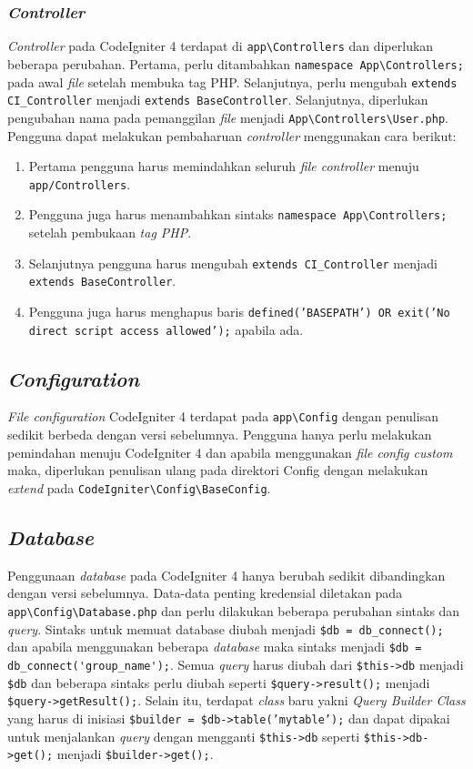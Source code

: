 \subsubsection{\textit{Controller}}
\textit{Controller} pada CodeIgniter 4 terdapat di \verb|app\Controllers| dan diperlukan beberapa perubahan. Pertama, perlu ditambahkan \verb|namespace App\Controllers;| pada awal \textit{file} setelah membuka tag PHP. Selanjutnya, perlu mengubah \verb|extends CI_Controller| menjadi \verb|extends BaseController|. Selanjutnya, diperlukan pengubahan nama pada pemanggilan \textit{file} menjadi \verb|App\Controllers\User.php|. Pengguna dapat melakukan pembaharuan \textit{controller} menggunakan cara berikut:
\begin{enumerate}
\item Pertama pengguna harus memindahkan seluruh \textit{file controller} menuju \verb|app/Controllers|.
\item Pengguna juga harus menambahkan sintaks \verb|namespace App\Controllers;| setelah pembukaan \textit{tag PHP}.
\item Selanjutnya pengguna harus mengubah \verb|extends CI_Controller| menjadi \verb|extends BaseController|.
\item Pengguna juga harus menghapus baris \texttt{defined('BASEPATH') OR exit('No direct script access allowed');} apabila ada.
\end{enumerate}
 
\subsection{\textit{Configuration}}

\textit{File configuration} CodeIgniter 4 terdapat pada \verb|app\Config| dengan penulisan sedikit berbeda dengan versi sebelumnya. Pengguna hanya perlu melakukan pemindahan menuju CodeIgniter 4 dan apabila menggunakan \textit{file config custom} maka, diperlukan penulisan ulang pada direktori Config dengan melakukan \textit{extend} pada \verb|CodeIgniter\Config\BaseConfig|.   

\subsection{\textit{Database}}

Penggunaan \textit{database} pada CodeIgniter 4 hanya berubah sedikit dibandingkan dengan versi sebelumnya. Data-data penting kredensial diletakan pada \verb|app\Config\Database.php| dan perlu dilakukan beberapa perubahan sintaks dan \textit{query}. Sintaks untuk memuat database diubah menjadi \verb|$db = db_connect();| dan  apabila menggunakan beberapa \textit{database} maka sintaks menjadi \verb|$db = db_connect('group_name');|. Semua \textit{query} harus diubah dari \verb|$this->db| menjadi \verb|$db| dan beberapa sintaks perlu diubah seperti \verb|$query->result();| menjadi \verb|$query->getResult();|. Selain itu, terdapat \textit{class} baru yakni \textit{Query Builder Class} yang harus di inisiasi \texttt{\$builder = \$db->table('mytable');} dan dapat dipakai untuk menjalankan \textit{query} dengan mengganti \verb|$this->db| seperti \verb|$this->db->get();| menjadi \verb|$builder->get();|.

